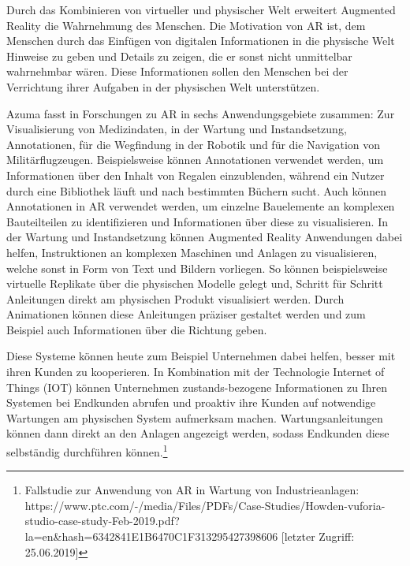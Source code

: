 \cite{Azuma1997} Durch das Kombinieren von virtueller und physischer Welt erweitert Augmented Reality die Wahrnehmung des Menschen. Die Motivation von AR ist, dem Menschen durch das Einfügen
von digitalen Informationen in die physische Welt Hinweise zu geben und Details zu zeigen, die er sonst nicht unmittelbar wahrnehmbar wären. Diese Informationen sollen den Menschen 
bei der Verrichtung ihrer Aufgaben in der physischen Welt unterstützen.

Azuma fasst in \cite{Azuma1997} Forschungen zu AR in sechs Anwendungsgebiete zusammen: Zur Visualisierung von Medizindaten, in der Wartung 
und Instandsetzung, Annotationen, für die Wegfindung in der Robotik und für die Navigation von Militärflugzeugen. Beispielsweise können Annotationen 
verwendet werden, um Informationen über den Inhalt von Regalen einzublenden, während ein Nutzer durch eine Bibliothek läuft und nach bestimmten Büchern sucht. %
Auch können Annotationen in AR verwendet werden, um einzelne Bauelemente an komplexen Bauteilteilen zu identifizieren und Informationen über diese zu visualisieren. 
In der Wartung und Instandsetzung können Augmented Reality Anwendungen dabei helfen, Instruktionen an komplexen Maschinen und Anlagen zu visualisieren, welche sonst in 
Form von Text und Bildern vorliegen. So können beispielsweise virtuelle Replikate über die physischen Modelle gelegt und, Schritt für Schritt Anleitungen direkt am physischen Produkt visualisiert werden. 
Durch Animationen können diese Anleitungen präziser gestaltet werden und zum Beispiel auch Informationen über die Richtung geben. 

Diese Systeme können heute zum Beispiel Unternehmen dabei helfen, besser mit ihren Kunden zu kooperieren. In Kombination mit der Technologie Internet of Things (IOT) können Unternehmen
zustands-bezogene Informationen zu Ihren Systemen bei Endkunden abrufen und proaktiv ihre Kunden auf notwendige Wartungen am physischen System aufmerksam machen. Wartungsanleitungen können dann direkt 
an den Anlagen angezeigt werden, sodass Endkunden diese selbständig durchführen können.\footnote{Fallstudie zur Anwendung von AR in Wartung von Industrieanlagen: https://www.ptc.com/-/media/Files/PDFs/Case-Studies/Howden-vuforia-studio-case-study-Feb-2019.pdf?la=en\&hash=6342841E1B6470C1F313295427398606 [letzter Zugriff: 25.06.2019]}

